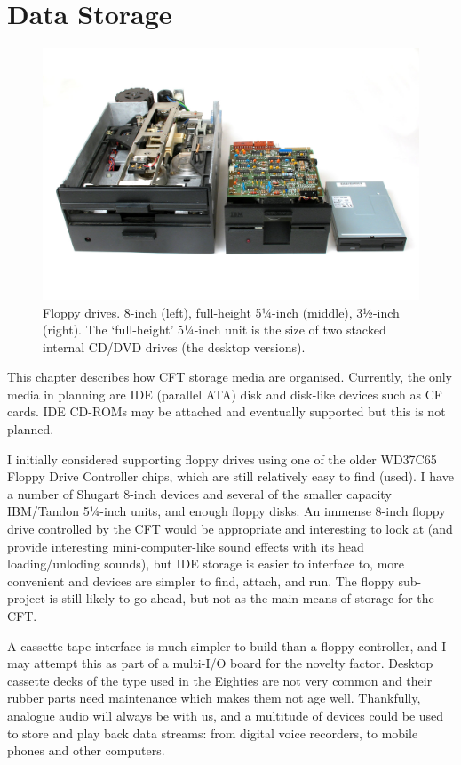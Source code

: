 



\chapter{Data Storage}
\label{sec:fs}

\begin{figure}
  \centering
  \includegraphics[width=0.75\columnwidth]{figs/Floppy_Disk_Drives_8_5_3.jpg}
  \caption[Floppy drives]{Floppy drives. 8-inch (left), full-height
    5¼-inch (middle), 3½-inch (right). The ‘full-height’ 5¼-inch unit
    is the size of two stacked internal CD/DVD drives (the desktop versions).}
\end{figure}


This chapter describes how CFT storage media are organised. Currently, the only
media in planning are IDE (parallel ATA) disk and disk-like devices such as CF
cards. IDE CD-ROMs may be attached and eventually supported but this is not
planned.

I initially considered supporting floppy drives using one of the older
WD37C65 Floppy Drive Controller chips, which are still relatively easy
to find (used). I have a number of Shugart 8-inch devices and several
of the smaller capacity IBM/Tandon 5¼-inch units, and enough floppy
disks. An immense 8-inch floppy drive controlled by the CFT would be
appropriate and interesting to look at (and provide interesting
mini-computer-like sound effects with its head loading/unloding
sounds), but IDE storage is easier to interface to, more convenient
and devices are simpler to find, attach, and run. The floppy
sub-project is still likely to go ahead, but not as the main means of
storage for the CFT.

A cassette tape interface is much simpler to build than a floppy
controller, and I may attempt this as part of a multi-I/O board for
the novelty factor. Desktop cassette decks of the type used in the
Eighties are not very common and their rubber parts need maintenance
which makes them not age well. Thankfully, analogue audio will always
be with us, and a multitude of devices could be used to store and play
back data streams: from digital voice recorders, to mobile phones and
other computers.

